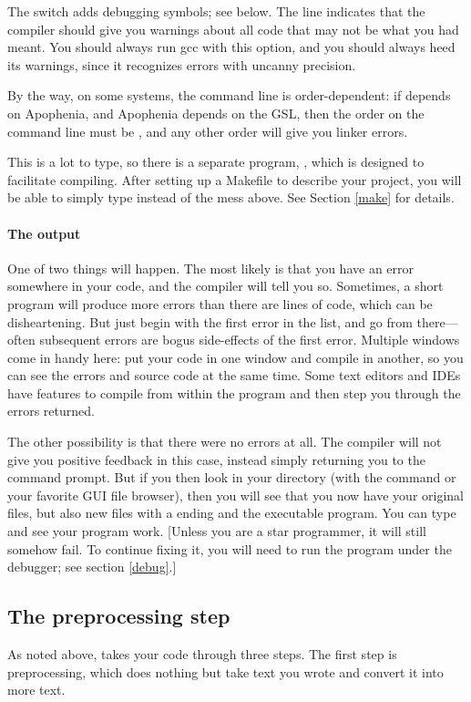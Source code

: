 \documentclass[12pt]{article}
\def\ind#1{\index{#1}#1}
\begin{document}
The  switch adds \ind{debugging} symbols; see below.  The
 line indicates that the compiler should give you warnings
about all code that may not be what you had meant. You should always run
gcc with this option, and you should always heed its warnings, since it
recognizes errors with uncanny precision.

By the way, on some systems, the command line is order-dependent: if 
depends on Apophenia, and Apophenia depends on the GSL, then the order
on the command line must be ,
and any other order will give you linker errors. 

This is a lot to type, so there is a separate program, ,
which is designed to facilitate compiling. After setting up a Makefile
to describe your project, you will be able to simply type  instead
of the mess above. See Section \ref{make} for details.

\paragraph{The output} One of two things will happen. The most likely is
that you have an error somewhere in your code, and the compiler will tell
you so. Sometimes, a short program will produce more errors than there
are lines of code, which can be disheartening. But just begin with the
first error in the list, and go from there---often subsequent errors are
bogus side-effects of the first error. Multiple windows come in handy
here: put your code in one window and compile in another, so you can
see the errors and source code at the same time. Some text editors and
IDEs have features to compile from within the program and then step you
through the errors returned.

The other possibility is that there were no errors at all. The compiler
will not give you positive feedback in this case, instead simply returning
you to the command prompt. But if you then look in your directory
(with the command  or your favorite GUI file browser),
then you will see that you now have your original  files,
but also new files with a  ending and the 
executable program. You can type  and see your program
work. [Unless you are a star programmer, it will still somehow fail. To
continue fixing it, you will need to run the program under the debugger;
see section \ref{debug}.]

\subsection{The preprocessing step} \label{headers}
As noted above,  takes your code through three steps.
The first step is preprocessing,
which does nothing but take text 
you wrote and convert it into more text.
\end{document}
